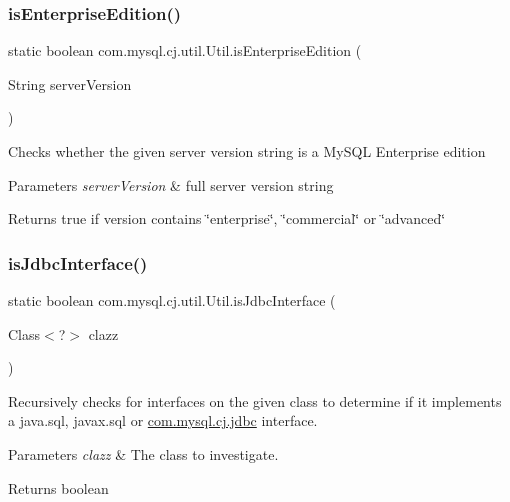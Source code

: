 \subsubsection{\texorpdfstring{is\+Enterprise\+Edition()}{isEnterpriseEdition()}}
{\footnotesize\ttfamily static boolean com.\+mysql.\+cj.\+util.\+Util.\+is\+Enterprise\+Edition (\begin{DoxyParamCaption}\item[{String}]{server\+Version }\end{DoxyParamCaption})\hspace{0.3cm}{\ttfamily [static]}}

Checks whether the given server version string is a My\+S\+QL Enterprise edition


\begin{DoxyParams}{Parameters}
{\em server\+Version} & full server version string \\
\hline
\end{DoxyParams}
\begin{DoxyReturn}{Returns}
true if version contains \char`\"{}enterprise\char`\"{}, \char`\"{}commercial\char`\"{} or \char`\"{}advanced\char`\"{} 
\end{DoxyReturn}
\mbox{\label{classcom_1_1mysql_1_1cj_1_1util_1_1_util_a6c781a9f788160ce358b6237b4a6b0da}} 
\subsubsection{\texorpdfstring{is\+Jdbc\+Interface()}{isJdbcInterface()}}
{\footnotesize\ttfamily static boolean com.\+mysql.\+cj.\+util.\+Util.\+is\+Jdbc\+Interface (\begin{DoxyParamCaption}\item[{Class$<$?$>$}]{clazz }\end{DoxyParamCaption})\hspace{0.3cm}{\ttfamily [static]}}

Recursively checks for interfaces on the given class to determine if it implements a java.\+sql, javax.\+sql or \mbox{\hyperlink{namespacecom_1_1mysql_1_1cj_1_1jdbc}{com.\+mysql.\+cj.\+jdbc}} interface.


\begin{DoxyParams}{Parameters}
{\em clazz} & The class to investigate. \\
\hline
\end{DoxyParams}
\begin{DoxyReturn}{Returns}
boolean 
\end{DoxyReturn}
\mbox{\label{classcom_1_1mysql_1_1cj_1_1util_1_1_util_a4ff66f7ccc05ec9631b13bb5e9e9fbbe}} 
